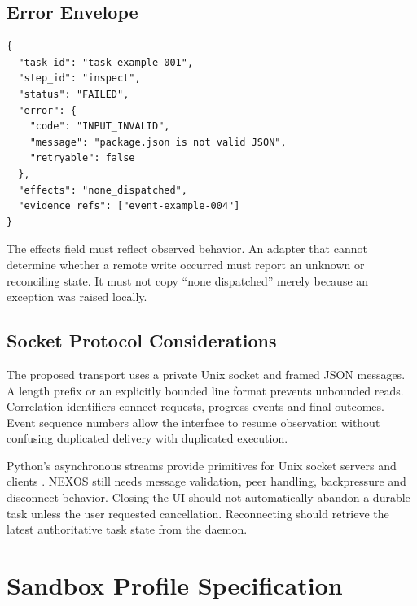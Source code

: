 \section{Error Envelope}
\begin{lstlisting}[caption={Illustrative structured failure result}]
{
  "task_id": "task-example-001",
  "step_id": "inspect",
  "status": "FAILED",
  "error": {
    "code": "INPUT_INVALID",
    "message": "package.json is not valid JSON",
    "retryable": false
  },
  "effects": "none_dispatched",
  "evidence_refs": ["event-example-004"]
}
\end{lstlisting}

The effects field must reflect observed behavior. An adapter that cannot determine whether a remote write occurred must report an unknown or reconciling state. It must not copy ``none dispatched'' merely because an exception was raised locally.

\section{Socket Protocol Considerations}
The proposed transport uses a private Unix socket and framed JSON messages. A length prefix or an explicitly bounded line format prevents unbounded reads. Correlation identifiers connect requests, progress events and final outcomes. Event sequence numbers allow the interface to resume observation without confusing duplicated delivery with duplicated execution.

Python's asynchronous streams provide primitives for Unix socket servers and clients \cite{asyncio}. NEXOS still needs message validation, peer handling, backpressure and disconnect behavior. Closing the UI should not automatically abandon a durable task unless the user requested cancellation. Reconnecting should retrieve the latest authoritative task state from the daemon.

\chapter{Sandbox Profile Specification}
